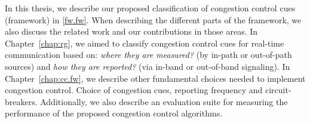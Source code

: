 
In this thesis, we describe our proposed classification of congestion control
cues (framework) in \ref{fw.fw}. When describing the different parts of the
framework, we also discuss the related work and our contributions in those
areas. In Chapter~\ref{chap:rg}, we aimed to classify congestion control cues
for real-time communication based on: \emph{where they are measured?} (by
in-path or out-of-path sources) and \emph{how they are reported?} (via in-band
or out-of-band signaling). In Chapter~\ref{chap:cc.fw}, we describe other
fundamental choices needed to implement congestion control. Choice of
congestion cues, reporting frequency and circuit-breakers. Additionally, we
also describe an evaluation suite for measuring the performance of the
proposed congestion control algorithms.



